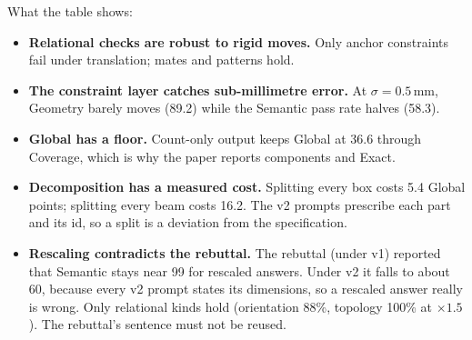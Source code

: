 \documentclass[10pt,a4paper]{article}
\begin{document}
\noindent What the table shows:
\begin{itemize}
\item \textbf{Relational checks are robust to rigid moves.} Only anchor constraints fail under translation; mates and patterns hold.
\item \textbf{The constraint layer catches sub-millimetre error.} At $\sigma=0.5$\,mm, Geometry barely moves (89.2) while the Semantic pass rate halves (58.3).
\item \textbf{Global has a floor.} Count-only output keeps Global at 36.6 through Coverage, which is why the paper reports components and Exact.
\item \textbf{Decomposition has a measured cost.} Splitting every box costs 5.4 Global points; splitting every beam costs 16.2. The v2 prompts prescribe each part and its id, so a split is a deviation from the specification.
\item \textbf{Rescaling contradicts the rebuttal.} The rebuttal (under v1) reported that Semantic stays near 99 for rescaled answers. Under v2 it falls to about 60, because every v2 prompt states its dimensions, so a rescaled answer really is wrong. Only relational kinds hold (orientation 88\%, topology 100\% at $\times1.5$). The rebuttal's sentence must not be reused.
\end{itemize}
\end{document}
